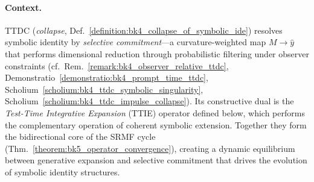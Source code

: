 \paragraph{Context.}
TTDC (\emph{collapse}, Def.~\ref{definition:bk4_collapse_of_symbolic_ide}) resolves symbolic identity by \emph{selective commitment}---a curvature-weighted map $M\!\to\!\widehat{y}$ that performs dimensional reduction through probabilistic filtering under observer constraints (cf.~Rem.~\ref{remark:bk4_observer_relative_ttdc}, Demonstratio~\ref{demonstratio:bk4_prompt_time_ttdc}, Scholium~\ref{scholium:bk4_ttdc_symbolic_singularity}, Scholium~\ref{scholium:bk4_ttdc_impulse_collapse}). Its constructive dual is the \emph{Test-Time Integrative Expansion} (TTIE) operator defined below, which performs the complementary operation of coherent symbolic extension. Together they form the bidirectional core of the SRMF cycle (Thm.~\ref{theorem:bk5_operator_convergence}), creating a dynamic equilibrium between generative expansion and selective commitment that drives the evolution of symbolic identity structures.

